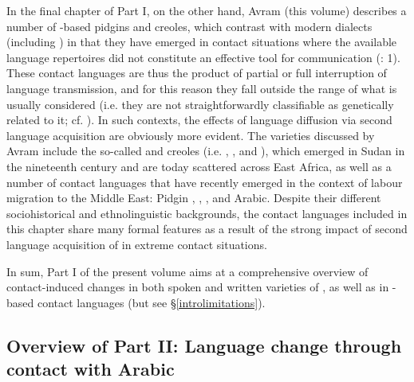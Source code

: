 \documentclass[output=paper]{langsci/langscibook}
\begin{document}
In the final chapter of Part I, on the other hand, Avram (this volume) describes a number of -based pidgins and creoles, which contrast with modern  dialects (including ) in that they have emerged in contact situations where the available language repertoires did not constitute an effective tool for communication (\citealt{BakkerMatras2013intro}: 1). These contact languages are thus the product of partial or full interruption of language {transmission}, and for this reason they fall outside the range of what is usually considered  (i.e. they are not straightforwardly classifiable as genetically related to it; cf. \citealt{McMahon2013}). In such contexts, the effects of language {diffusion} via second language acquisition are obviously more evident. The varieties discussed by Avram include the so-called  and creoles (i.e.  , , and ), which emerged in Sudan in the nineteenth century and are today scattered across East Africa, as well as a number of contact languages that have recently emerged in the context of labour migration to the Middle East:  Pidgin , ,  , and  Arabic. Despite their different sociohistorical and ethnolinguistic backgrounds, the contact languages included in this chapter share many formal features as a result of the strong impact of second language acquisition of  in extreme contact situations.

In sum, Part I of the present volume aims at a comprehensive overview of contact-induced changes in both spoken and written varieties of , as well as in -based contact languages (but see §\ref{introlimitations}).

\subsection{Overview of Part II: Language change through contact
with Arabic}\label{intropartIIoverview}
\end{document}
